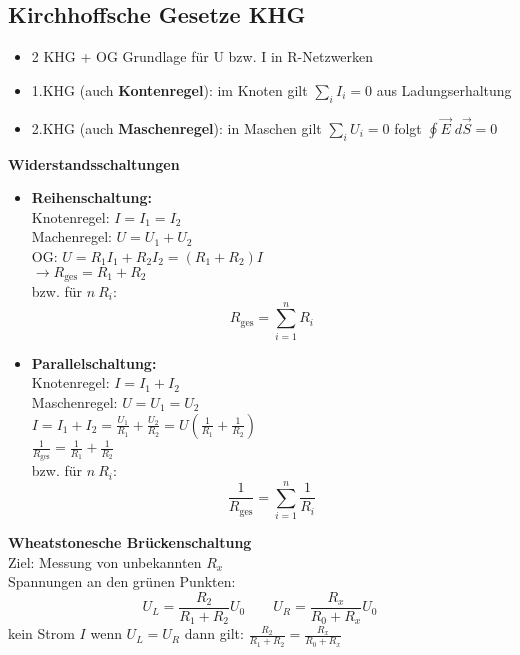 \documentclass[titlepage,12pt,a4paper,ngerman]{report}
\newcommand{\tx}[1]{\textrm{#1}}
\begin{document}
\subsection{Kirchhoffsche Gesetze KHG}
\begin{itemize}
	\item 2 KHG + OG Grundlage für U bzw. I in R-Netzwerken
	\item 1.KHG (auch \textbf{Kontenregel}): im Knoten gilt $ \sum_i I_i = 0 $ aus Ladungserhaltung
	\item 2.KHG (auch \textbf{Maschenregel}): in Maschen gilt $ \sum_i U_i = 0 $ folgt $ \oint \vec{E} \; d\vec{S} = 0 $
\end{itemize}
\textbf{Widerstandsschaltungen}
\begin{itemize}
	\item \textbf{Reihenschaltung:}\\
	Knotenregel: $ I = I_1 = I_2 $\\
	Machenregel: $ U = U_1 + U_2 $\\
	OG: $ U = R_1 I_1 + R_2 I_2 = (R_1 +R_2) I $\\
	$ \rightarrow R_{\tx{ges}} = R_1 + R_2 $\\
	bzw. für $ n\ R_i:$ $$R_{\tx{ges}} = \sum_{i=1}^{n} R_i $$
	\item \textbf{Parallelschaltung:}\\
	Knotenregel: $ I = I_1 +I_2 $\\
	Maschenregel: $ U = U_1 = U_2 $\\
	$I = I_1 + I_2 = \frac{U_1}{R_1} + \frac{U_2}{R_2} = U (\frac{1}{R_1}+\frac{1}{R_2})$\\
	$ \frac{1}{R_{\tx{ges}}} = \frac{1}{R_1} + \frac{1}{R_2} $\\
	bzw. für $ n \ R_i:$ $$\frac{1}{R_{\tx{ges}}} = \sum_{i=1}^{n}  \frac{1}{R_i}$$
\end{itemize}
\textbf{Wheatstonesche Brückenschaltung}\\
Ziel: Messung von unbekannten $ R_x $\\
Spannungen an den grünen Punkten:
$$U_L = \frac{R_2}{R_1 + R_2} U_0 \qquad U_R = \frac{R_x}{R_0 + R_x} U_0 $$
kein Strom $I$ wenn $ U_L = U_R $ dann gilt: $ \frac{R_2}{R_1+R_2} = \frac{R_x}{R_0 + R_x} $
\end{document}
